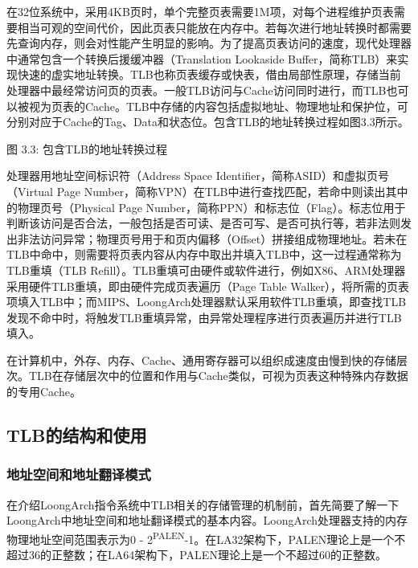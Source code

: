 \documentclass[]{ctexbook}
\begin{document}
在32位系统中，采用4KB页时，单个完整页表需要1M项，对每个进程维护页表需要相当可观的空间代价，因此页表只能放在内存中。若每次进行地址转换时都需要先查询内存，则会对性能产生明显的影响。为了提高页表访问的速度，现代处理器中通常包含一个转换后援缓冲器（Translation Lookaside Buffer，简称TLB）来实现快速的虚实地址转换。TLB也称页表缓存或快表，借由局部性原理，存储当前处理器中最经常访问页的页表。一般TLB访问与Cache访问同时进行，而TLB也可以被视为页表的Cache。TLB中存储的内容包括虚拟地址、物理地址和保护位，可分别对应于Cache的Tag、Data和状态位。包含TLB的地址转换过程如图3.3所示。

图 3.3: 包含TLB的地址转换过程

处理器用地址空间标识符（Address Space Identifier，简称ASID）和虚拟页号（Virtual Page Number，简称VPN）在TLB中进行查找匹配，若命中则读出其中的物理页号（Physical Page Number，简称PPN）和标志位（Flag）。标志位用于判断该访问是否合法，一般包括是否可读、是否可写、是否可执行等，若非法则发出非法访问异常；物理页号用于和页内偏移（Offset）拼接组成物理地址。若未在TLB中命中，则需要将页表内容从内存中取出并填入TLB中，这一过程通常称为TLB重填（TLB Refill）。TLB重填可由硬件或软件进行，例如X86、ARM处理器采用硬件TLB重填，即由硬件完成页表遍历（Page Table Walker），将所需的页表项填入TLB中；而MIPS、LoongArch处理器默认采用软件TLB重填，即查找TLB发现不命中时，将触发TLB重填异常，由异常处理程序进行页表遍历并进行TLB填入。

在计算机中，外存、内存、Cache、通用寄存器可以组织成速度由慢到快的存储层次。TLB在存储层次中的位置和作用与Cache类似，可视为页表这种特殊内存数据的专用Cache。

\hypertarget{tlbux7684ux7ed3ux6784ux548cux4f7fux7528}{%
\subsection{TLB的结构和使用}\label{tlbux7684ux7ed3ux6784ux548cux4f7fux7528}}

\hypertarget{ux5730ux5740ux7a7aux95f4ux548cux5730ux5740ux7ffbux8bd1ux6a21ux5f0f}{%
\subsubsection{地址空间和地址翻译模式}\label{ux5730ux5740ux7a7aux95f4ux548cux5730ux5740ux7ffbux8bd1ux6a21ux5f0f}}

在介绍LoongArch指令系统中TLB相关的存储管理的机制前，首先简要了解一下LoongArch中地址空间和地址翻译模式的基本内容。LoongArch处理器支持的内存物理地址空间范围表示为0 - 2\textsuperscript{PALEN}-1。在LA32架构下，PALEN理论上是一个不超过36的正整数；在LA64架构下，PALEN理论上是一个不超过60的正整数。
\end{document}
